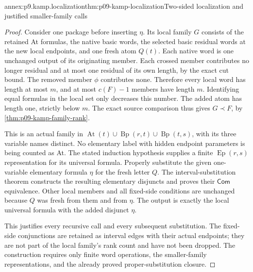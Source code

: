 \begin{annexitem}{annex:p9.kamp.localization}{thm:p09-kamp-localization}{Two-sided localization and justified smaller-family calls}
\begin{proof}
Consider one package before inserting \(\eta\). Its local
family \(G\) consists of the retained At formulas, the native
basic words, the selected basic residual words at the new local
endpoints, and one fresh atom \(Q(t)\). Each native word is
one unchanged output of its originating member. Each crossed
member contributes no longer residual and at most one residual
of its own length, by the exact cut bound. The removed member
\(\phi\) contributes none. Therefore every local word has
length at most \(m\), and at most \(c(F)-1\) members
have length \(m\). Identifying equal formulas in the local
set only decreases this number. The added atom has length one,
strictly below \(m\). The exact source comparison thus gives
\(G\prec F\), by \cref{thm:p09-kamp-family-rank}.

This is an actual family in
\(\operatorname{At}(t)\cup\operatorname{Bp}(r,t)\cup
\operatorname{Bp}(t,s)\), with its three variable names distinct.
No elementary label with hidden endpoint parameters is being
counted as At. The stated induction hypothesis supplies a finite
\(\operatorname{Ep}(r,s)\) representation for its universal
formula. Properly substitute the given one-variable elementary
formula \(\eta\) for the fresh letter \(Q\).
The interval-substitution theorem constructs the resulting
elementary disjuncts and proves their \(\mathsf{Com}\)
equivalence. Other local members and all fixed-side conditions
are unchanged because \(Q\) was fresh from them and from
\(\eta\). The output is exactly the local universal formula
with the added disjunct \(\eta\).

This justifies every recursive call and every subsequent substitution.
The fixed-side conjunctions are retained as interval edges with
their actual endpoints; they are not part of the local family's
rank count and have not been dropped. The construction requires
only finite word operations, the smaller-family representations,
and the already proved proper-substitution closure.
\end{proof}
\end{annexitem}

